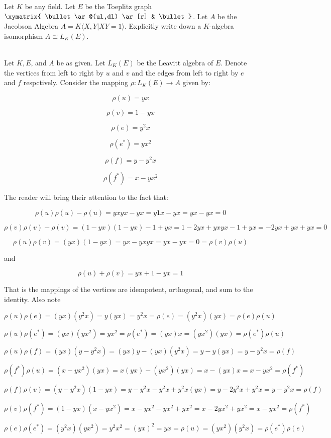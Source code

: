Let $K$ be any field. Let $E$ be the Toeplitz graph  \ \ \
$\xymatrix{ \bullet \ar@(ul,dl)  \ar[r] & \bullet}$. Let $A$ be the Jacobson Algebra
$A=K\langle X,Y|XY=1\rangle$. Explicitly write down a $K$-algebra isomorphism $A\cong L_K(E)$.\\

\begin{solution}\renewcommand{\qedsymbol}{}\ \\
    Let $K, E$, and $A$ be as given. Let $L_K(E)$ be the Leavitt algebra of $E$. Denote the vertices
    from left to right by $u$ and $v$ and the edges from left to right by $e$ and $f$ respctively.
    Consider the mapping $\rho:L_K(E)\to A$ given by:

    $$\rho(u)=yx$$

    $$\rho(v)=1-yx$$

    $$\rho(e)=y^2x$$

    $$\rho(e^*)=yx^2$$

    $$\rho(f)=y-y^2x$$

    $$\rho(f^*)=x-yx^2$$

    The reader will bring their attention to the fact that:

    $$\rho(u)\rho(u)-\rho(u)=yxyx-yx=y1x-yx=yx-yx=0$$

    $$\rho(v)\rho(v)-\rho(v)=(1-yx)(1-yx)-1+yx=1-2yx+yxyx-1+yx=-2yx+yx+yx=0$$

    $$\rho(u)\rho(v)=(yx)(1-yx)=yx-yxyx=yx-yx=0=\rho(v)\rho(u)$$

    and

    $$\rho(u)+\rho(v)=yx+1-yx=1$$

    That is the mappings of the vertices are idempotent, orthogonal, and sum to the identity. Also note
    
    $$\rho(u)\rho(e)=(yx)(y^2x)=y(yx)=y^2x=\rho(e)=(y^2x)(yx)=\rho(e)\rho(u)$$

    $$\rho(u)\rho(e^*)=(yx)(yx^2)=yx^2=\rho(e^*)=(yx)x=(yx^2)(yx)=\rho(e^*)\rho(u)$$

    $$\rho(u)\rho(f)=(yx)(y-y^2x)=(yx)y-(yx)(y^2x)=y-y(yx)=y-y^2x=\rho(f)$$

    $$\rho(f^*)\rho(u)=(x-yx^2)(yx)=x(yx)-(yx^2)(yx)=x-(yx)x=x-yx^2=\rho(f^*)$$

    $$\rho(f)\rho(v)=(y-y^2x)(1-yx)=y-y^2x-y^2x+y^2x(yx)=y-2y^2x+y^2x=y-y^2x=\rho(f)$$

    $$\rho(v)\rho(f^*)=(1-yx)(x-yx^2)=x-yx^2-yx^2+yx^2=x-2yx^2+yx^2=x-yx^2=\rho(f^*)$$

    $$\rho(e)\rho(e^*)=(y^2x)(yx^2)=y^2x^2=(yx)^2=yx=\rho(u)=(yx^2)(y^2x)=\rho(e^*)\rho(e)$$


\end{solution}
